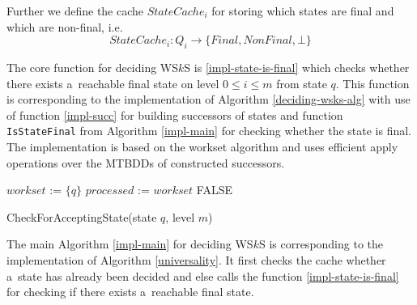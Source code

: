  Further we define the cache $\mathit{StateCache}_i$ for storing which states
 are final and which are non-final, i.e.
 \begin{equation}
  \mathit{StateCache}_i : Q_i \rightarrow \{Final, NonFinal, \bot\}
 \end{equation}
 
 The core function for deciding WS$k$S is \ref{impl-state-is-final} which checks
 whether there exists a~reachable final state on level $0 \leq i \leq m$ from
 state $q$. This function is corresponding to the implementation of Algorithm
 \ref{deciding-wsks-alg} with use of function \ref{impl-succ} for building successors of
 states and function \texttt{IsStateFinal} from Algorithm \ref{impl-main} for
 checking whether the state is final.
 The implementation is based on the workset algorithm and uses efficient apply
 operations over the MTBDDs of constructed successors.
 
\begin{function}[ht!]
		 
		\BlankLine
		\nl $\mathit{workset}$ := $\{q\}$\;
		\nl $\mathit{processed}$ := $\mathit{workset}$\;
		\nl {}
			\nl\Return \textsc{FALSE}\;
		\caption{CheckForAcceptingState(state $q$, level
		$m$)}\label{impl-state-is-final}
\end{function}
 
 The main Algorithm \ref{impl-main} for deciding WS$k$S is corresponding to the
 implementation of Algorithm \ref{universality}. It first checks the cache
 whether a~state has already been decided and else calls the
 function \ref{impl-state-is-final} for checking if there exists
 a~reachable final state.
 
